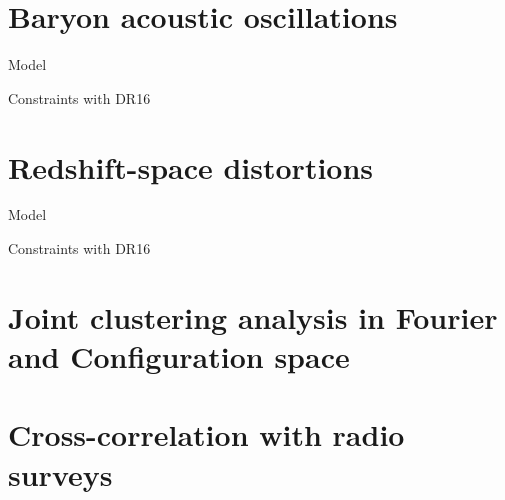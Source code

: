\section{Baryon acoustic oscillations}
\label{galaxies:bao}

Model 

Constraints with DR16 

\section{Redshift-space distortions}
\label{galaxies:rsd}

Model 

Constraints with DR16 

\section{Joint clustering analysis in Fourier and Configuration space}
\label{galaxies:joint}




\section{Cross-correlation with radio surveys}
\label{galaxies:radio}

\cite{wolzHIConstraintsCrosscorrelation2021}